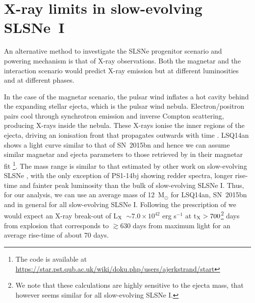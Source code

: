 \documentclass[useAMS,usenatbib]{mn2e}
\def\M{M$_{\odot}$}
\def\an{LSQ14an}
\begin{document}
\section{X-ray limits in slow-evolving SLSNe~I}\label{sec:xr}

An alternative method to investigate the SLSNe progenitor scenario and powering mechanism is that of X-ray observations. Both the magnetar and the interaction scenario would predict X-ray emission but at different luminosities and at different phases.

In the case of the magnetar scenario, the pulsar wind inflates a hot cavity behind the expanding stellar ejecta, which is the pulsar wind nebula. Electron/positron pairs cool through synchrotron emission and inverse Compton scattering, producing X-rays inside the nebula. These X-rays ionise the inner regions of the ejecta, driving an ionisation front that propagates outwards with time \citep{me14}.
\an\/ shows a light curve similar to that of SN~2015bn and hence we can assume similar magnetar and ejecta parameters to those retrieved by \citet[][P = $1.7-2.1$ ms, B$_{\rm 14}=0.9-1.0$ G and M$_{\rm ej}=8-15$\M\/]{ni16a} in their magnetar fit \citep[for the magnetar semi analytic code see prescription of][]{in13}\footnote{The code is available at \url{https://star.pst.qub.ac.uk/wiki/doku.php/users/ajerkstrand/start}}. The mass range is similar to that
 estimated by other work on slow-evolving SLSNe \citep{ni13,ch15}, with the only exception of PS1-14bj \citep{lu16} showing redder spectra, longer rise-time and fainter peak luminosity than the bulk of slow-evolving SLSNe I. Thus, for our analysis, we can use an average mass of 12~\M\/ for \an\/, SN~2015bn and in general for all slow-evolving SLSNe I.
Following the prescription of \citet[][their equations 5, 6, 56 and A11]{me14} we would expect an X-ray break-out of L$_{\rm X}$~$\sim7.0\times10^{42}$ erg s$^{-1}$ at t$_{\rm X}>700$\footnote{We note that these calculations are highly sensitive to the ejecta mass, that however seems similar for all slow-evolving SLSNe I.} days from explosion that corresponds to $\gtrsim$630 days from maximum light for an average rise-time of about 70 days.
\end{document}
